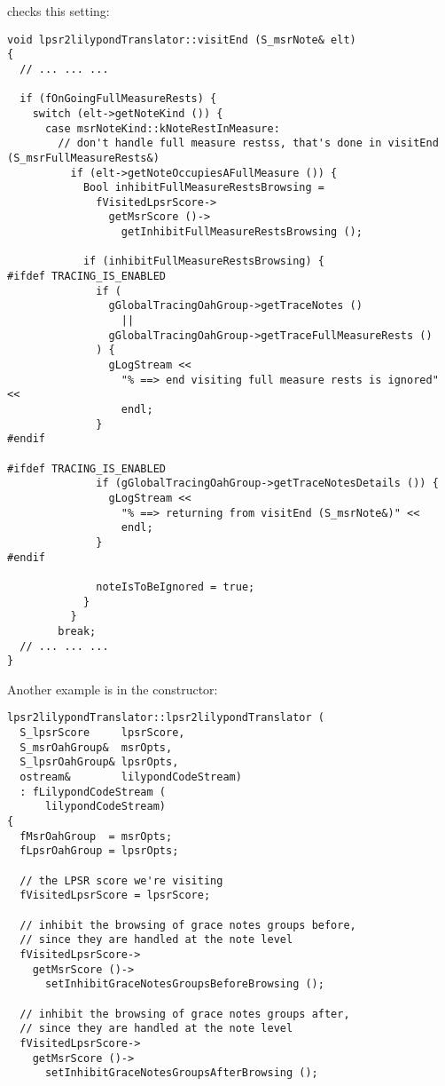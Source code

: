  checks this setting:
\begin{lstlisting}[language=CPlusPlus]
void lpsr2lilypondTranslator::visitEnd (S_msrNote& elt)
{
  // ... ... ...

  if (fOnGoingFullMeasureRests) {
    switch (elt->getNoteKind ()) {
      case msrNoteKind::kNoteRestInMeasure:
        // don't handle full measure restss, that's done in visitEnd (S_msrFullMeasureRests&)
          if (elt->getNoteOccupiesAFullMeasure ()) {
            Bool inhibitFullMeasureRestsBrowsing =
              fVisitedLpsrScore->
                getMsrScore ()->
                  getInhibitFullMeasureRestsBrowsing ();

            if (inhibitFullMeasureRestsBrowsing) {
#ifdef TRACING_IS_ENABLED
              if (
                gGlobalTracingOahGroup->getTraceNotes ()
                  ||
                gGlobalTracingOahGroup->getTraceFullMeasureRests ()
              ) {
                gLogStream <<
                  "% ==> end visiting full measure rests is ignored" <<
                  endl;
              }
#endif

#ifdef TRACING_IS_ENABLED
              if (gGlobalTracingOahGroup->getTraceNotesDetails ()) {
                gLogStream <<
                  "% ==> returning from visitEnd (S_msrNote&)" <<
                  endl;
              }
#endif

              noteIsToBeIgnored = true;
            }
          }
        break;
  // ... ... ...
}
\end{lstlisting}

Another example is in the  constructor:
\begin{lstlisting}[language=CPlusPlus]
lpsr2lilypondTranslator::lpsr2lilypondTranslator (
  S_lpsrScore     lpsrScore,
  S_msrOahGroup&  msrOpts,
  S_lpsrOahGroup& lpsrOpts,
  ostream&        lilypondCodeStream)
  : fLilypondCodeStream (
      lilypondCodeStream)
{
  fMsrOahGroup  = msrOpts;
  fLpsrOahGroup = lpsrOpts;

  // the LPSR score we're visiting
  fVisitedLpsrScore = lpsrScore;

  // inhibit the browsing of grace notes groups before,
  // since they are handled at the note level
  fVisitedLpsrScore->
    getMsrScore ()->
      setInhibitGraceNotesGroupsBeforeBrowsing ();

  // inhibit the browsing of grace notes groups after,
  // since they are handled at the note level
  fVisitedLpsrScore->
    getMsrScore ()->
      setInhibitGraceNotesGroupsAfterBrowsing ();
\end{lstlisting}


